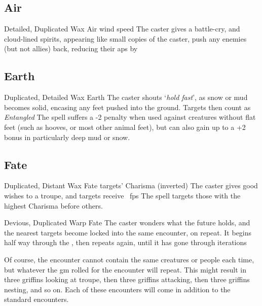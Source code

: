 \begin{multicols}{2}

\subsection{Air}

  {Detailed, Duplicated}%
  {Wax}%
  {Air}%
  {wind speed}%
  {The caster gives a battle-cry, and cloud-lined spirits, appearing like small copies of the caster, push any enemies (but not allies) back, reducing their \glspl{ap} by }%
  {}


\subsection{Earth}

  {Duplicated, Detailed}%
  {Wax}%
  {Earth}%
  {}%
  {The caster shouts `\textit{hold fast}', as snow or mud becomes solid, encasing any feet pushed into the ground.
  Targets then count as \textit{Entangled}}%
  {
  The spell suffers a -2 penalty when used against creatures without flat feet (such as hooves, or most other animal feet), but can also gain up to a +2 bonus in particularly deep mud or snow.}


\subsection{Fate}

  {Duplicated, Distant}%
  {Wax}%
  {Fate}%
  {targets' Charisma (inverted)}%
  {The caster gives good wishes to a troupe, and  targets receive \showDam~\glspl{fp}}%
  {The spell targets those with the highest Charisma before others.}


  {Devious, Duplicated}%
  {Warp}%
  {Fate}%
  {}%
  {The caster wonders what the future holds, and the nearest  targets become locked into the same encounter, on repeat.
  It begins half way through the \showOnset, then repeats again, until it has gone through  iterations}%
  {\par
  Of course, the encounter cannot contain the same creatures or people each time, but whatever the \gls{gm} rolled for the encounter will repeat.
  This might result in three griffins looking at troupe, then three griffins attacking, then three griffins nesting, and so on.
  Each of these encounters will come in addition to the standard encounters.}


\end{multicols}
